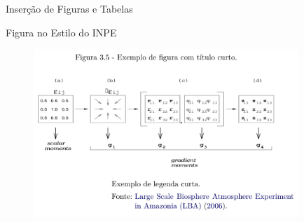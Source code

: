 \documentclass[10pt]{beamer}
\begin{document}
\begin{frame}{Inserção de Figuras e Tabelas}
    \begin{block}{Figura no Estilo do INPE}
        \begin{figure}[H]
          \begin{center}
            \includegraphics[width=10cm]{./figs/exefigestiinpe.pdf}  
          \end{center}
        \end{figure}
    \end{block}
\end{frame}

\end{document}
